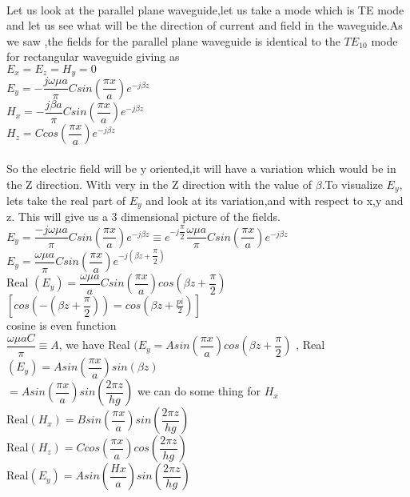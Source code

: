 	\paragraph{}Let us look at the parallel plane waveguide,let us take a mode which is TE mode and let us see what will be the direction of current and field in the waveguide.As we saw ,the fields for the parallel plane waveguide is identical to the $TE_{10}$ mode for rectangular waveguide giving as\\
		${E_x = E_z = H_y = 0}$\\
		$E_y = -\dfrac{j\omega \mu a}{\pi}Csin(\dfrac{\pi x}{a})e^{-j\beta z}$\\
			$H_x = -\dfrac{j\beta a}{\pi}Csin(\dfrac{\pi x}{a})e^{-j\beta z}$\\
				$H_z = Ccos(\dfrac{\pi x}{a})e^{-j\beta z}$
	\paragraph{}So the electric field will be y oriented,it will have a variation which would be in the Z direction. With very in the Z direction with the value of ${\beta}$.To visualize ${E_y}$, lets take the real part of ${E_y}$ and look at its variation,and with respect to x,y and z. This will give us a 3 dimensional picture of the fields.\\
	$E_y = \dfrac{-j\omega \mu a}{\pi}Csin(\dfrac{\pi x}{a})e^{
		-j\beta z}\equiv e^{-j\dfrac{\pi}{2}}\dfrac{\omega \mu a}{\pi}Csin(\dfrac{\pi x}{a})e^{-j\beta z}$\\
		${E_y = \dfrac{\omega \mu a}{\pi}Csin(\dfrac{\pi x}{a})e^{-j(\beta z + \dfrac{\pi}{2})
}}$\\
Real ${(E_y) = \dfrac{\omega \mu a}{a}Csin(\dfrac{\pi x}{a})cos(\beta z + \dfrac{\pi}{2})}$\\
${[cos(-(\beta z + \dfrac{\pi}{2}))=cos(\beta z + \frac{pi}{2})]}$\\
cosine is even function\\
${\dfrac{\omega \mu aC}{\pi}\equiv A}$, we have Real ${(E_y = Asin(\dfrac{\pi x}{a})cos(\beta z +\dfrac{\pi}{2})}$ ,
Real ${(E_y)= Asin(\dfrac{\pi x}{a})sin(\beta z)}$\\
${= Asin(\dfrac{\pi x}{a})sin(\dfrac{2\pi z}{hg})}$ we can do some thing for ${H_x}$\\
Real${(H_x)= Bsin(\dfrac{\pi x}{a})sin(\dfrac{2\pi z}{hg})}$\\
Real${(H_z)= Ccos(\dfrac{\pi x}{a})cos(\dfrac{2\pi z}{hg})}$\\
Real${(E_y)= Asin(\dfrac{Hx}{a})sin(\dfrac{2\pi z}{hg})}$
